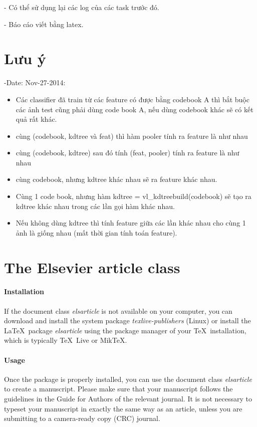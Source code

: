 \documentclass[review]{elsarticle}
\begin{document}
- Có thể sử dụng lại các log của các task trước đó.

- Báo cáo viết bằng latex.
\section{Lưu ý}
-Date: Nov-27-2014:
\begin{itemize}
\item Các classifier đã train từ các feature có được bằng codebook A thì bắt buộc các ảnh test cũng phải dùng code book A, nếu dùng codebook khác sẽ có kết quả rất khác.
\item cùng (codebook, kdtree và feat) thì hàm pooler tính ra feature là như nhau
\item cùng (codebook, kdtree)  sau đó tính (feat, pooler) tính ra feature là như nhau
\item cùng codebook, nhưng kdtree khác nhau sẽ ra feature khác nhau.
\item Cùng 1 code book, nhưng hàm kdtree = vl_kdtreebuild(codebook) sẽ tạo ra kdtree khác nhau trong các lần gọi hàm khác nhau.
\item Nếu không dùng kdtree thì tính feature giữa các lần khác nhau cho cùng 1 ảnh là giống nhau (mất thời gian tính toán feature).

\end{itemize}

 

\section{The Elsevier article class}

\paragraph{Installation} If the document class \emph{elsarticle} is not available on your computer, you can download and install the system package \emph{texlive-publishers} (Linux) or install the \LaTeX\ package \emph{elsarticle} using the package manager of your \TeX\ installation, which is typically \TeX\ Live or Mik\TeX.

\paragraph{Usage} Once the package is properly installed, you can use the document class \emph{elsarticle} to create a manuscript. Please make sure that your manuscript follows the guidelines in the Guide for Authors of the relevant journal. It is not necessary to typeset your manuscript in exactly the same way as an article, unless you are submitting to a camera-ready copy (CRC) journal.
\end{document}
